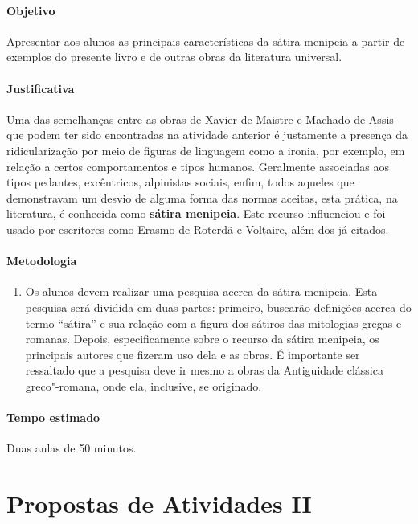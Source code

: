 \documentclass[12pt]{extarticle}
\begin{document}
\paragraph{Objetivo} Apresentar aos alunos as principais características
da sátira menipeia a partir de exemplos do presente livro e de outras obras
da literatura universal.

\paragraph{Justificativa} Uma das semelhanças entre as obras de Xavier de Maistre 
e Machado de Assis que podem ter sido encontradas na atividade
anterior é justamente a presença da ridicularização por meio de figuras de 
linguagem como a ironia, por exemplo, em relação a certos comportamentos e tipos humanos. 
Geralmente associadas aos tipos pedantes, excêntricos,
alpinistas sociais, enfim, todos aqueles que demonstravam um desvio de alguma forma
das normas aceitas, esta prática, na literatura, é conhecida como 
\textbf{sátira menipeia}. Este recurso influenciou e foi usado por
escritores como Erasmo de Roterdã e Voltaire, além dos já citados.

\paragraph{Metodologia}
\begin{enumerate}
	\item
	Os alunos devem realizar uma pesquisa acerca da sátira menipeia.
	Esta pesquisa será dividida em duas partes: primeiro, buscarão
	definições acerca do termo ``sátira'' e sua relação com a figura
	dos sátiros das mitologias gregas e romanas. 
	Depois, especificamente sobre o recurso da sátira menipeia,
	os principais autores que fizeram uso dela e as obras. 
	É importante ser ressaltado que a pesquisa deve ir mesmo a obras
	da Antiguidade clássica greco"-romana, onde ela, inclusive, se originado.
\end{enumerate}

\paragraph{Tempo estimado} Duas aulas de 50 minutos.

\section{Propostas de Atividades II}
\end{document}

